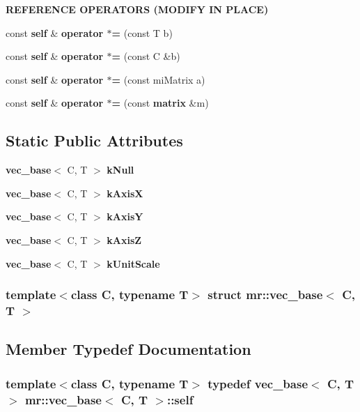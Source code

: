 \begin{Indent}{\bf REFERENCE OPERATORS (MODIFY IN PLACE)}\par
\begin{CompactItemize}
\item 
const {\bf self} \& {\bf operator $\ast$=} (const T b)
\item 
const {\bf self} \& {\bf operator $\ast$=} (const C \&b)
\item 
const {\bf self} \& {\bf operator $\ast$=} (const mi\-Matrix a)
\item 
const {\bf self} \& {\bf operator $\ast$=} (const {\bf matrix} \&m)
\end{CompactItemize}
\end{Indent}
\subsection*{Static Public Attributes}
\begin{CompactItemize}
\item 
{\bf vec\_\-base}$<$ C, T $>$ {\bf k\-Null}
\item 
{\bf vec\_\-base}$<$ C, T $>$ {\bf k\-Axis\-X}
\item 
{\bf vec\_\-base}$<$ C, T $>$ {\bf k\-Axis\-Y}
\item 
{\bf vec\_\-base}$<$ C, T $>$ {\bf k\-Axis\-Z}
\item 
{\bf vec\_\-base}$<$ C, T $>$ {\bf k\-Unit\-Scale}
\end{CompactItemize}
\subsubsection*{template$<$class C, typename T$>$ struct mr::vec\_\-base$<$ C, T $>$}



\subsection{Member Typedef Documentation}
\subsubsection{\setlength{\rightskip}{0pt plus 5cm}template$<$class C, typename T$>$ typedef {\bf vec\_\-base}$<$ C, T $>$ {\bf mr::vec\_\-base}$<$ C, T $>$::{\bf self}}\label{structmr_1_1vec__base_w0}




